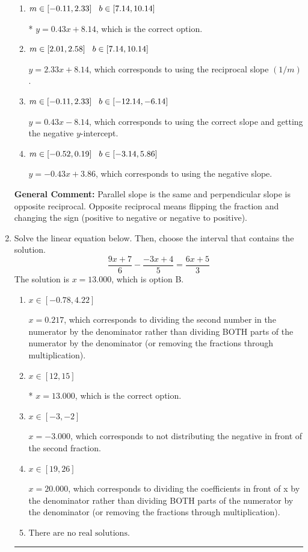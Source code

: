 \documentclass{extbook}[14pt]
\newcommand{\litem}[1]{\item #1

\rule{\textwidth}{0.4pt}}
\begin{document}
\begin{enumerate}
{\begin{enumerate}[label=\Alph*.]
 $y = 0.43x + 11.00$, which corresponds to correct slope and mis-distributing while simplifying to slope-intercept form.
\item \( m \in [-0.11, 2.33] \hspace*{3mm} b \in [7.14, 10.14] \)

* $y = 0.43x + 8.14$, which is the correct option.
\item \( m \in [2.01, 2.58] \hspace*{3mm} b \in [7.14, 10.14] \)

 $y = 2.33x + 8.14$, which corresponds to using the reciprocal slope $(1/m)$.
\item \( m \in [-0.11, 2.33] \hspace*{3mm} b \in [-12.14, -6.14] \)

 $y = 0.43x - 8.14$, which corresponds to using the correct slope and getting the negative $y$-intercept.
\item \( m \in [-0.52, 0.19] \hspace*{3mm} b \in [-3.14, 5.86] \)

 $y = -0.43x + 3.86$, which corresponds to using the negative slope.
\end{enumerate}

\textbf{General Comment:} Parallel slope is the same and perpendicular slope is opposite reciprocal. Opposite reciprocal means flipping the fraction and changing the sign (positive to negative or negative to positive).
}
\litem{
Solve the linear equation below. Then, choose the interval that contains the solution.
\[ \frac{9x + 7}{6} - \frac{-3x + 4}{5} = \frac{6x + 5}{3} \]The solution is \( x = 13.000 \), which is option B.\begin{enumerate}[label=\Alph*.]
\item \( x \in [-0.78, 4.22] \)

 $x = 0.217$, which corresponds to dividing the second number in the numerator by the denominator rather than dividing BOTH parts of the numerator by the denominator (or removing the fractions through multiplication).
\item \( x \in [12, 15] \)

* $x = 13.000$, which is the correct option.
\item \( x \in [-3, -2] \)

 $x = -3.000$, which corresponds to not distributing the negative in front of the second fraction.
\item \( x \in [19, 26] \)

 $x = 20.000$, which corresponds to dividing the coefficients in front of x by the denominator rather than dividing BOTH parts of the numerator by the denominator (or removing the fractions through multiplication).
\item \( \text{There are no real solutions.} \)


\end{enumerate}}
\end{enumerate}
\end{document}
